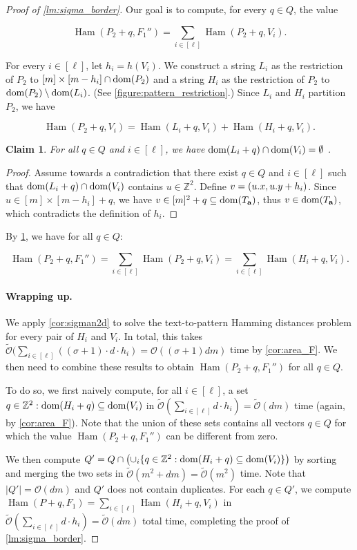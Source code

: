 \documentclass[a4paper,11pt]{article}
\let\Cref\cref
\newtheorem{claim}{Claim}[section]
\newcommand{\Z}{\mathbb{Z}}
\renewcommand{\O}{\mathcal{O}}
\newcommand{\tO}{\tilde{\mathcal{O}}}
\newcommand{\Ta}{T_\mathbf{a}}
\DeclareMathOperator*{\Ham}{Ham}
\newcommand{\absolute}[1]{\left\lvert#1\right\rvert}
\begin{document}
\begin{proof}[{Proof of \cref{lm:sigma_border}}]
Our goal is to compute, for every $q \in Q$, the value

\[ \Ham(P_2 + q, F_1'') = \sum_{i \in [\ell]} \Ham(P_2 + q, V_i).\]

For every $i \in [\ell]$, let $h_i = h(V_i)$. We construct a string $L_i$ as the restriction of $P_2$ to $[m] \times [m - h_i] \cap \operatorname*{dom}(P_2)$ and a string $H_i$ as the restriction of $P_2$ to $\operatorname*{dom}(P_2) \setminus \operatorname*{dom}(L_i)$. (See \Cref{figure:pattern_restriction}.) Since $L_i$ and $H_i$ partition $P_2$, we have

\[\Ham(P_2 + q, V_i) = \Ham(L_i + q, V_i) + \Ham(H_i + q, V_i). \]

\begin{claim}\label{pattern_height_reduction}
For all $q \in Q$ and $i \in [\ell]$, we have $\operatorname*{dom}(L_i + q) \cap \operatorname*{dom}(V_i) = \emptyset$ .
\end{claim}
\begin{proof}
Assume towards a contradiction that there exist $q \in Q$ and $i \in [\ell]$ such that $\operatorname*{dom}(L_i + q) \cap \operatorname*{dom}(V_i)$ contains $u \in \Z^2$. Define $v = (u.x, u.y + h_i)$.
Since $u \in [m] \times [m - h_i] + q$, we have $v \in [m]^2 + q \subseteq \d{\Ta}$, thus $v \in \d{\Ta}$, which contradicts the definition of $h_i$.
\end{proof}

By \Cref{pattern_height_reduction}, we have for all $q \in Q$:

\[\Ham(P_2 + q, F_1'') = \sum_{i \in [\ell]} \Ham(P_2 + q, V_i) = \sum_{i \in [\ell]} \Ham(H_i + q, V_i). \]

\paragraph{Wrapping up.}
We apply \cref{cor:sigman2d} to solve the text-to-pattern Hamming distances problem for every pair of $H_i$ and $V_i$. In total, this takes $\tO(\sum_{i \in [\ell]} ((\sigma+1) \cdot d \cdot h_i) = \O((\sigma+1) dm)$ time by \cref{cor:area_F}. We then need to combine these results to obtain $\Ham(P_2 + q, F_1'')$ for all $q \in Q$. 

To do so, we first naively compute, for all $i \in [\ell]$, a set ${q \in \Z^2 : \d{H_i+q} \subseteq \d{V_i}}$ in $\tO(\sum_{i \in [\ell]} d \cdot h_i) = \tO(dm)$ time (again, by \cref{cor:area_F}). Note that the union of these sets contains all vectors $q \in Q$ for which the value $\Ham(P_2 + q, F_1'')$ can be different from zero. 

We then compute $Q' = Q \cap \bigl( \cup_i \{q \in \Z^2 : \d{H_i+q} \subseteq \d{V_i}\} \bigr)$ by sorting and merging the two sets in $\tO(m^2 + dm) = \tO(m^2)$ time. Note that $\absolute{Q'} = \O(dm)$ and $Q'$ does not contain duplicates. For each $q \in Q'$, we compute $\Ham(P + q, F_1) = \sum_{i \in [\ell]} \Ham(H_i + q, V_i)$ in $\tO(\sum_{i \in [\ell]} d \cdot h_i) = \tO(dm)$ total time, completing the proof of \cref{lm:sigma_border}.
\end{proof}
\end{document}
